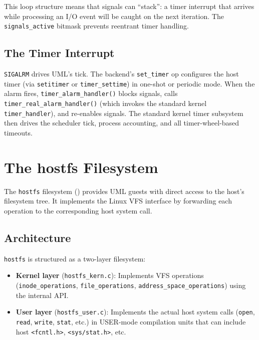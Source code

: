 This loop structure means that signals can ``stack'': a timer interrupt that
arrives while processing an I/O event will be caught on the next iteration.
The \texttt{signals\_active} bitmask prevents reentrant timer handling.

\subsection{The Timer Interrupt}

\texttt{SIGALRM} drives UML's tick.  The backend's \texttt{set\_timer} op
configures the host timer (via \texttt{setitimer} or \texttt{timer\_settime})
in one-shot or periodic mode.  When the alarm fires,
\texttt{timer\_alarm\_handler()} blocks signals, calls
\texttt{timer\_real\_alarm\_handler()} (which invokes the standard kernel
\texttt{timer\_handler}), and re-enables signals.  The standard kernel timer
subsystem then drives the scheduler tick, process accounting, and all
timer-wheel-based timeouts.

\section{The hostfs Filesystem}
\label{sec:impl-hostfs}

The \texttt{hostfs} filesystem () provides UML guests
with direct access to the host's filesystem tree.  It implements the Linux VFS
interface by forwarding each operation to the corresponding host system call.

\subsection{Architecture}

\texttt{hostfs} is structured as a two-layer filesystem:

\begin{itemize}[nosep]
\item \textbf{Kernel layer} (\texttt{hostfs\_kern.c}): Implements VFS
  operations (\texttt{inode\_operations}, \texttt{file\_operations},
  \texttt{address\_space\_operations}) using the internal API.
\item \textbf{User layer} (\texttt{hostfs\_user.c}): Implements the actual
  host system calls (\texttt{open}, \texttt{read}, \texttt{write},
  \texttt{stat}, etc.) in USER-mode compilation units that can include
  host \texttt{<fcntl.h>}, \texttt{<sys/stat.h>}, etc.
\end{itemize}

